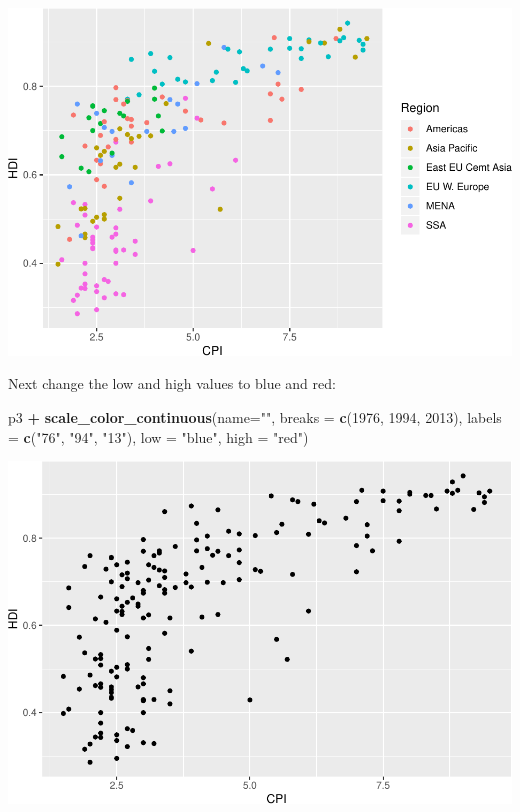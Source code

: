\documentclass[
]{book}
\newenvironment{Shaded}{\begin{snugshade}}{\end{snugshade}}
\newcommand{\DataTypeTok}[1]{\textcolor[rgb]{0.13,0.29,0.53}{#1}}
\newcommand{\DecValTok}[1]{\textcolor[rgb]{0.00,0.00,0.81}{#1}}
\newcommand{\KeywordTok}[1]{\textcolor[rgb]{0.13,0.29,0.53}{\textbf{#1}}}
\newcommand{\NormalTok}[1]{#1}
\newcommand{\OperatorTok}[1]{\textcolor[rgb]{0.81,0.36,0.00}{\textbf{#1}}}
\newcommand{\StringTok}[1]{\textcolor[rgb]{0.31,0.60,0.02}{#1}}
\begin{document}
\includegraphics{R/Rgraphics/figures/unnamed-chunk-196-1.pdf}

Next change the low and high values to blue and red:

\begin{Shaded}
\begin{Highlighting}[]
\NormalTok{p3 }\OperatorTok{+}
\StringTok{  }\KeywordTok{scale\_color\_continuous}\NormalTok{(}\DataTypeTok{name=}\StringTok{""}\NormalTok{,}
                         \DataTypeTok{breaks =} \KeywordTok{c}\NormalTok{(}\DecValTok{1976}\NormalTok{, }\DecValTok{1994}\NormalTok{, }\DecValTok{2013}\NormalTok{),}
                         \DataTypeTok{labels =} \KeywordTok{c}\NormalTok{(}\StringTok{"\textquotesingle{}76"}\NormalTok{, }\StringTok{"\textquotesingle{}94"}\NormalTok{, }\StringTok{"\textquotesingle{}13"}\NormalTok{),}
                         \DataTypeTok{low =} \StringTok{"blue"}\NormalTok{, }\DataTypeTok{high =} \StringTok{"red"}\NormalTok{)}
\end{Highlighting}
\end{Shaded}

\includegraphics{R/Rgraphics/figures/unnamed-chunk-197-1.pdf}
\end{document}

